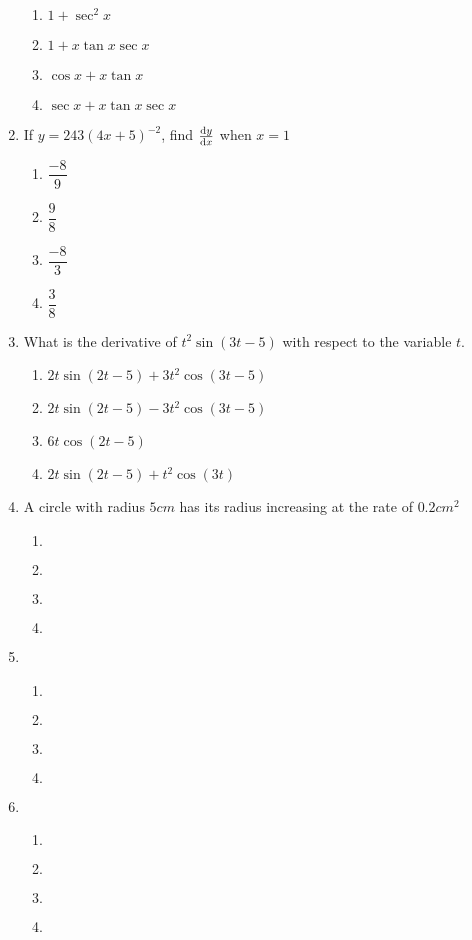 \begin{multicols}{2}
\begin{enumerate}[label={\arabic*.}]
\begin{enumerate}[label={\Alph*.}]
	\item \(1 + \sec^{2}x\)
	\item \(1 + x\tan x\sec x\)
	\item \(\cos x + x\tan x \)
	\item \(\sec x + x\tan x \sec x\)
	\end{enumerate}
\item If \(y=243{(4x+5)}^{-2}\), find \(\dv{y}{x}\) when \(x=1\)
	\begin{enumerate}[label={\Alph*.}]
	\item \(\dfrac{-8}{9}\)
	\item \(\dfrac{9}{8}\)
	\item \(\dfrac{-8}{3}\)
	\item \(\dfrac{3}{8}\)
	\end{enumerate}
\item What is the derivative of \({t}^{2}\sin(3t-5)\) with respect to the variable \(t\).
	\begin{enumerate}[label={\Alph*.}]
	\item \(2t \sin(2t-5) + 3{t}^2\cos(3t-5)\)
	\item \(2t \sin(2t-5) - 3{t}^2\cos(3t-5)\)
	\item \(6t\cos(2t-5)\)
	\item \(2t \sin(2t-5) + t^2\cos(3t)\)
	\end{enumerate}
\item A circle with radius \(5 cm \) has its radius increasing at the rate of \(0.2 {cm}^2\)
	\begin{enumerate}[label={\Alph*.}]
	\item \(\)
	\item \(\)
	\item \(\)
	\item \(\)
	\end{enumerate}
\item
	\begin{enumerate}[label={\Alph*.}]
	\item \(\)
	\item \(\)
	\item \(\)
	\item \(\)
	\end{enumerate}
\item
	\begin{enumerate}[label={\Alph*.}]
	\item \(\)
	\item \(\)
	\item \(\)
	\item \(\)
	\end{enumerate}

\end{enumerate}
\end{multicols}
